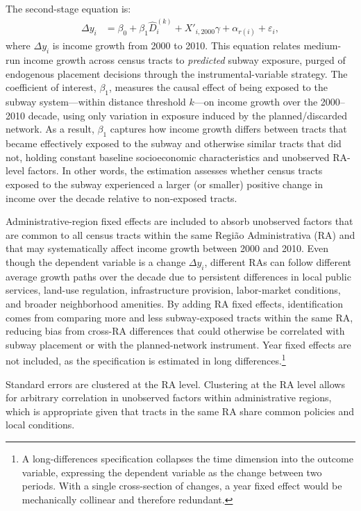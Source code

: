 The second-stage equation is:
\begin{align}
    \Delta y_{i} &= \beta_{0} + \beta_{1} \hat{D}_{i}^{(k)} + X'_{i,2000}\gamma + \alpha_{r(i)} + \varepsilon_{i}, \label{eq:second_stage_rafe}
\end{align}
where $\Delta y_{i}$ is income growth from 2000 to 2010. This equation relates medium-run income growth across census tracts to \emph{predicted} subway exposure, purged of endogenous placement decisions through the instrumental-variable strategy. The coefficient of interest, $\beta_{1}$, measures the causal effect of being exposed to the subway system—within distance threshold $k$—on income growth over the 2000--2010 decade, using only variation in exposure induced by the planned/discarded network. As a result, $\beta_{1}$ captures how income growth differs between tracts that became effectively exposed to the subway and otherwise similar tracts that did not, holding constant baseline socioeconomic characteristics and unobserved RA-level factors. In other words, the estimation assesses whether census tracts exposed to the subway experienced a larger (or smaller) positive change in income over the decade relative to non-exposed tracts.

Administrative-region fixed effects are included to absorb unobserved factors that are common to all census tracts within the same Região Administrativa (RA) and that may systematically affect income growth between 2000 and 2010. Even though the dependent variable is a change $\Delta y_{i}$, different RAs can follow different average growth paths over the decade due to persistent differences in local public services, land-use regulation, infrastructure provision, labor-market conditions, and broader neighborhood amenities. By adding RA fixed effects, identification comes from comparing more and less subway-exposed tracts within the same RA, reducing bias from cross-RA differences that could otherwise be correlated with subway placement or with the planned-network instrument. Year fixed effects are not included, as the specification is estimated in long differences.\footnote{A long-differences specification collapses the time dimension into the outcome variable, expressing the dependent variable as the change between two periods. With a single cross-section of changes, a year fixed effect would be mechanically collinear and therefore redundant.}

Standard errors are clustered at the RA level. Clustering at the RA level allows for arbitrary correlation in unobserved factors within administrative regions, which is appropriate given that tracts in the same RA share common policies and local conditions.
